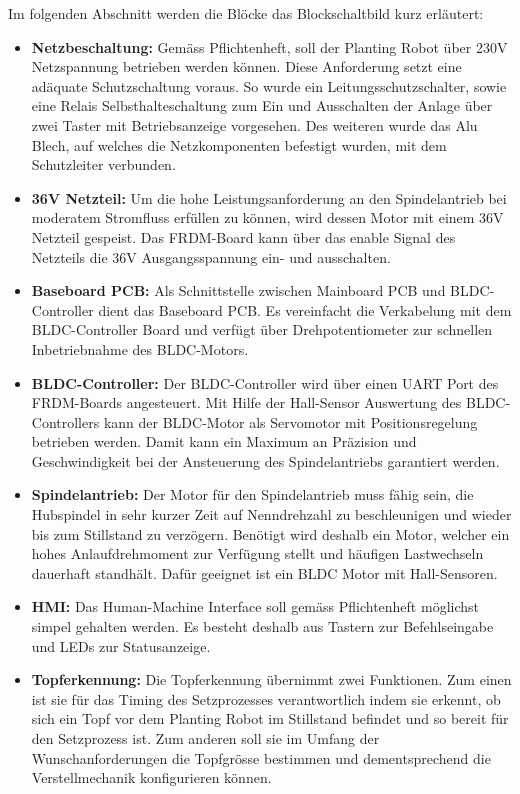 Im folgenden Abschnitt werden die Blöcke das Blockschaltbild kurz erläutert:
\begin{itemize}
	\item \textbf{Netzbeschaltung:} Gemäss Pflichtenheft, soll der Planting Robot über 230V Netzspannung betrieben werden können. Diese Anforderung setzt eine adäquate Schutzschaltung voraus. So wurde ein Leitungsschutzschalter, sowie eine Relais Selbsthalteschaltung zum Ein und Ausschalten der Anlage über zwei Taster mit Betriebsanzeige vorgesehen. Des weiteren wurde das Alu Blech, auf welches die Netzkomponenten befestigt wurden, mit dem Schutzleiter verbunden.

	\item \textbf{36V Netzteil:} Um die hohe Leistungsanforderung an den Spindelantrieb bei moderatem Stromfluss erfüllen zu können, wird dessen Motor mit einem 36V Netzteil gespeist. Das FRDM-Board kann über das enable Signal des Netzteils die 36V Ausgangsspannung ein- und ausschalten.
	
	\item \textbf{Baseboard PCB:} Als Schnittstelle zwischen Mainboard PCB und BLDC-Controller dient das Baseboard PCB. Es vereinfacht die Verkabelung mit dem BLDC-Controller Board und verfügt über Drehpotentiometer zur schnellen Inbetriebnahme des BLDC-Motors.
	
	\item \textbf{BLDC-Controller:} Der BLDC-Controller wird über einen UART Port des FRDM-Boards angesteuert. Mit Hilfe der Hall-Sensor Auswertung des BLDC-Controllers kann der BLDC-Motor als Servomotor mit Positionsregelung betrieben werden. Damit kann ein Maximum an Präzision und Geschwindigkeit bei der Ansteuerung des Spindelantriebs garantiert werden.
	
	\item \textbf{Spindelantrieb:} Der Motor für den Spindelantrieb muss fähig sein, die Hubspindel in sehr kurzer Zeit auf Nenndrehzahl zu beschleunigen und wieder bis zum Stillstand zu verzögern. Benötigt wird deshalb ein Motor, welcher ein hohes Anlaufdrehmoment zur Verfügung stellt und häufigen Lastwechseln dauerhaft standhält. Dafür geeignet ist ein BLDC Motor mit Hall-Sensoren.
		
	\item \textbf{HMI:} Das Human-Machine Interface soll gemäss Pflichtenheft möglichst simpel gehalten werden. Es besteht deshalb aus Tastern zur Befehlseingabe und LEDs zur Statusanzeige. 
		
	\item \textbf{Topferkennung:} Die Topferkennung übernimmt zwei Funktionen. Zum einen ist sie für das Timing des Setzprozesses verantwortlich indem sie erkennt, ob sich ein Topf vor dem Planting Robot im Stillstand befindet und so bereit für den Setzprozess ist. Zum anderen soll sie im Umfang der Wunschanforderungen die Topfgrösse bestimmen und dementsprechend die Verstellmechanik konfigurieren können.
	

\end{itemize}
